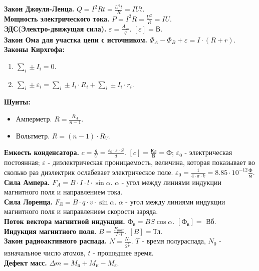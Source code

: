 \documentclass{article}
\begin{document}
	\textbf{Закон Джоуля-Ленца.} $Q = I^2Rt = \frac{U^2t}{R} = IUt$. \\
	\textbf{Мощность электрического тока.} $P = I^2R = \frac{U^2}{R} = IU$. \\
	\textbf{ЭДС(Электро-движущая сила).} $\varepsilon = \frac{A_{\text{ст}}}{q}$. $[\varepsilon] = \text{В}$. \\
	\textbf{Закон Ома для участка цепи с источником.} $\Phi_{A} - \Phi_{B} + \varepsilon = I \cdot (R + r)$. \\
	\textbf{Законы Кирхгофа:}
	\begin{enumerate}
		\item $\sum \limits_{i} \pm I_{i} = 0$.
		\item $\sum \limits_{i} \pm \varepsilon_{i} = \sum \limits_{i} \pm I_{i} \cdot R_{i} + \sum \limits_{i} \pm I_{i} \cdot r_{i}$.
	\end{enumerate}
	\textbf{Шунты:}
	\begin{itemize}
		\item Амперметр. $R = \frac{R_{A}}{n - 1}$.
		\item Вольтметр. $R = (n - 1) \cdot R_{V}$.
	\end{itemize}
	\textbf{Емкость конденсатора.} $c = \frac{q}{U} = \frac{\varepsilon_{0} \cdot \varepsilon \cdot S}{d}$. $[c] = \frac{\text{Кл}}{\text{В}} = \text{Ф}$; $\varepsilon_{0}$ - электрическая постоянная; $\varepsilon$ - диэлектрическая проницаемость, величина, которая показывает во сколько раз диэлектрик ослабевает электрическое поле. $\varepsilon_{0} = \frac{1}{4 \cdot \pi \cdot k} = 8.85 \cdot 10^{-12} \frac{\text{Ф}}{\text{м}}$. \\
	\textbf{Сила Ампера.} $F_{A} = B \cdot I \cdot l \cdot \sin\alpha$. $\alpha$ - угол между линиями индукции магнитного поля и направлением тока. \\
	\textbf{Сила Лоренца.} $F_{\text{Л}} = B \cdot q \cdot v \cdot \sin\alpha$. $\alpha$ - угол между линиями индукции магнитного поля и направлением скорости заряда. \\
	\textbf{Поток вектора магнитной индукции.} $\text{Ф}_{\text{в}} = BS \cos\alpha$. $[\text{Ф}_{\text{в}}] =$ Вб. \\
	\textbf{Индукция магнитного поля.} $B = \frac{F_{max}}{I \cdot l}$. $[B] = \text{Тл}$. \\
	\textbf{Закон радиоактивного распада.} $N = \frac{N_{0}}{2^{\frac{t}{T}}}$. $T$ - время полураспада, $N_{0}$ - изначальное число атомов, $t$ - прошедшее время. \\
	\textbf{Дефект масс.} $\varDelta m = M_{\text{п}} + M_{\text{н}} - M_{\text{я}}$. \\
\end{document}
